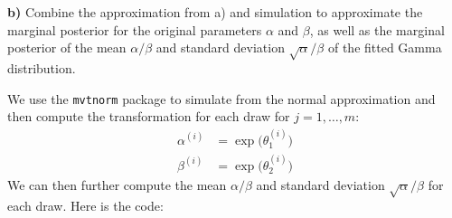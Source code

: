 \documentclass[
  letterpaper,
  DIV=11,
  numbers=noendperiod]{scrartcl}
\begin{document}
\textbf{b)} Combine the approximation from a) and simulation to
approximate the marginal posterior for the original parameters
\(\alpha\) and \(\beta\), as well as the marginal posterior of the mean
\(\alpha/\beta\) and standard deviation \(\sqrt{\alpha}/\beta\) of the
fitted Gamma distribution.

\begin{tcolorbox}[enhanced jigsaw, opacityback=0, bottomrule=.15mm, title={Solution}, colback=white, colframe=quarto-callout-note-color-frame, breakable, toprule=.15mm, arc=.35mm, bottomtitle=1mm, left=2mm, coltitle=black, colbacktitle=quarto-callout-note-color!10!white, titlerule=0mm, rightrule=.15mm, toptitle=1mm, leftrule=.75mm, opacitybacktitle=0.6]

We use the \texttt{mvtnorm} package to simulate from the normal
approximation and then compute the transformation for each draw for
\(j=1,\ldots,m\): \[
\begin{aligned}
\alpha^{(i)} &= \exp\big(\theta_1^{(i)} \big) \\
\beta^{(i)} &= \exp\big(\theta_2^{(i)} \big)
\end{aligned}
\] We can then further compute the mean \(\alpha/\beta\) and standard
deviation \(\sqrt{\alpha}/\beta\) for each draw. Here is the code:


\end{tcolorbox}
\end{document}
